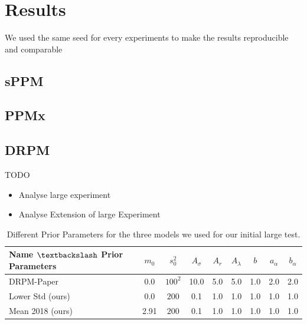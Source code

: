 \documentclass[12pt,a4paper]{article}
\begin{document}
\newpage

\section{Results}
We used the same seed for every experiments to make the results
reproducible and comparable
\subsection{sPPM}
\subsection{PPMx}
\subsection{DRPM}
TODO
\begin{itemize}
    \item Analyse large experiment
    \item Analyse Extension of large Experiment
\end{itemize}

\begin{table}[h]
\centering
\begin{tabular}{lcccccccc}
\toprule
Name $\textbackslash$ Prior Parameters & $m_0$ & $s_0^2$ & $A_\sigma$ & $A_r$ & $A_\lambda$ & $b$ & $a_\alpha$ & $b_\alpha$ \\
\midrule
DRPM-Paper \cite{Page2021-Temporal} & 0.0   & $100^2$ & 10.0         & 5.0     & 5.0           & 1.0   & 2.0        & 2.0        \\
Lower Std (ours)                                & 0.0   & $200$   & 0.1        & 1.0     & 1.0           & 1.0   & 1.0          & 1.0          \\
Mean 2018 (ours)                                & 2.91  & $200$  & 0.1        & 1.0     & 1.0           & 1.0   & 1.0          & 1.0         \\
\bottomrule
\end{tabular}
\caption{Different Prior Parameters for the three models we used for our initial large test.}
\label{tab:DRPMPriorParam}
\end{table}
\end{document}
